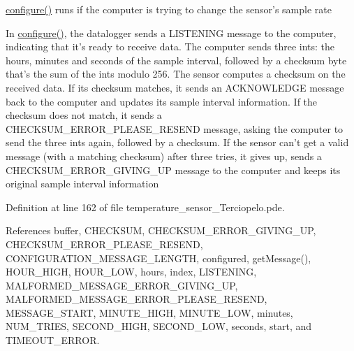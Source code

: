 \hyperlink{nublogger_8h_e369b3765489ee8bd0ea791c1843630f}{configure()} runs if the computer is trying to change the sensor's sample rate 

In \hyperlink{nublogger_8h_e369b3765489ee8bd0ea791c1843630f}{configure()}, the datalogger sends a LISTENING message to the computer, indicating that it's ready to receive data. The computer sends three ints: the hours, minutes and seconds of the sample interval, followed by a checksum byte that's the sum of the ints modulo 256. The sensor computes a checksum on the received data. If its checksum matches, it sends an ACKNOWLEDGE message back to the computer and updates its sample interval information. If the checksum does not match, it sends a CHECKSUM\_\-ERROR\_\-PLEASE\_\-RESEND message, asking the computer to send the three ints again, followed by a checksum. If the sensor can't get a valid message (with a matching checksum) after three tries, it gives up, sends a CHECKSUM\_\-ERROR\_\-GIVING\_\-UP message to the computer and keeps its original sample interval information 

Definition at line 162 of file temperature\_\-sensor\_\-Terciopelo.pde.

References buffer, CHECKSUM, CHECKSUM\_\-ERROR\_\-GIVING\_\-UP, CHECKSUM\_\-ERROR\_\-PLEASE\_\-RESEND, CONFIGURATION\_\-MESSAGE\_\-LENGTH, configured, getMessage(), HOUR\_\-HIGH, HOUR\_\-LOW, hours, index, LISTENING, MALFORMED\_\-MESSAGE\_\-ERROR\_\-GIVING\_\-UP, MALFORMED\_\-MESSAGE\_\-ERROR\_\-PLEASE\_\-RESEND, MESSAGE\_\-START, MINUTE\_\-HIGH, MINUTE\_\-LOW, minutes, NUM\_\-TRIES, SECOND\_\-HIGH, SECOND\_\-LOW, seconds, start, and TIMEOUT\_\-ERROR.

